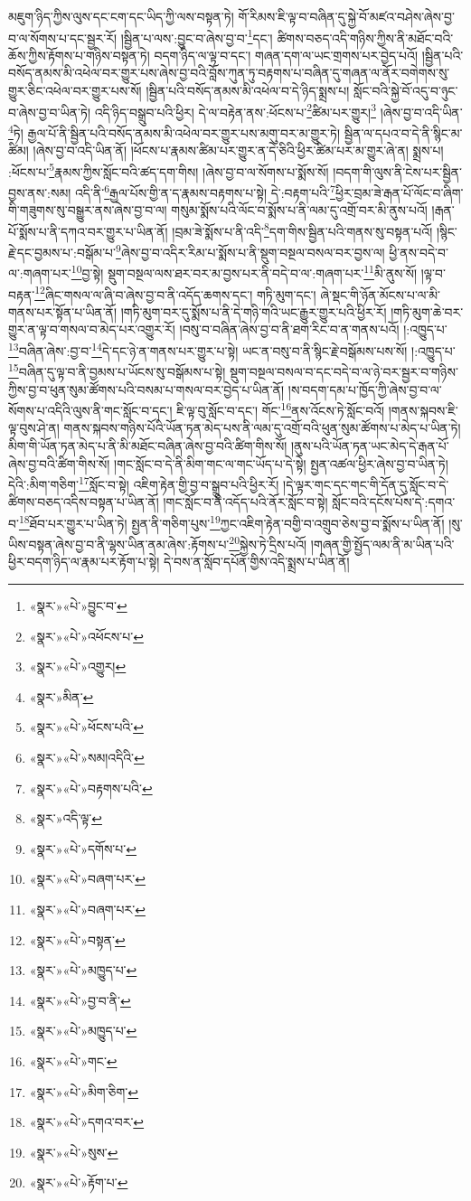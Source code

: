 མཇུག་ཉིད་ཀྱིས་ལུས་དང་ངག་དང་ཡིད་ཀྱི་ལས་བསྟན་ཏེ། གོ་རིམས་ཇི་ལྟ་བ་བཞིན་དུ་སྐྱེ་བོ་མཛའ་བཤེས་ཞེས་བྱ་བ་ལ་སོགས་པ་དང་སྦྱར་རོ། །སྦྱིན་པ་ལས་:བྱུང་བ་ཞེས་བྱ་བ་\footnote{«སྣར་»«པེ་»བྱུང་བ་}དང་། ཚིགས་བཅད་འདི་གཉིས་ཀྱིས་ནི་མཐོང་བའི་ཆོས་ཀྱིས་རྟོགས་པ་གཉིས་བསྟན་ཏེ། བདག་ཉིད་ལ་ལྟ་བ་དང་། གཞན་དག་ལ་ཡང་གྲགས་པར་བྱེད་པའོ། །སྦྱིན་པའི་བསོད་ནམས་མི་འཕེལ་བར་གྱུར་པས་ཞེས་བྱ་བའི་བློས་ཀུན་ཏུ་བརྟགས་པ་བཞིན་དུ་གཞན་ལ་ནོར་བགེགས་སུ་གྱུར་ཅིང་འཕེལ་བར་གྱུར་པས་སོ། །སྦྱིན་པའི་བསོད་ནམས་མི་འཕེལ་བ་དེ་ཉིད་སྨྲས་པ། སློང་བའི་སྐྱེ་བོ་འདུ་བ་ཉུང་བ་ཞེས་བྱ་བ་ཡིན་ཏེ། འདི་ཉིད་བསྒྲུབ་པའི་ཕྱིར། དེ་ལ་བརྟེན་ནས་:ཕོངས་པ་\footnote{«སྣར་»«པེ་»འཕོངས་པ་}ཚིམ་པར་གྱུར།\footnote{«སྣར་»«པེ་»འགྱུར།} །ཞེས་བྱ་བ་འདི་ཡིན་\footnote{«སྣར་»མིན་}ཏེ། རྒྱལ་པོ་ནི་སྦྱིན་པའི་བསོད་ནམས་མི་འཕེལ་བར་གྱུར་པས་མགུ་བར་མ་གྱུར་ཏེ། སྦྱིན་ལ་དཔའ་བ་དེ་ནི་སྙིང་མ་ཚིམ། །ཞེས་བྱ་བ་འདི་ཡིན་ནོ། །ཕོངས་པ་རྣམས་ཚིམ་པར་གྱུར་ན་དེ་ཅིའི་ཕྱིར་ཚིམ་པར་མ་གྱུར་ཞེ་ན། སྨྲས་པ། :ཕོངས་པ་\footnote{«སྣར་»«པེ་»ཕོངས་པའི་}རྣམས་ཀྱིས་སློང་བའི་ཚད་དག་གིས། །ཞེས་བྱ་བ་ལ་སོགས་པ་སྨོས་སོ། །བདག་གི་ལུས་ནི་ངེས་པར་སྦྱིན་བྱས་ནས་:སམ། འདི་ནི་\footnote{«སྣར་»«པེ་»སམ།འདིའི་}རྒྱལ་པོས་གྱི་ན་ད་རྣམས་བརྟགས་པ་སྟེ། དེ་:བརྟག་པའི་\footnote{«སྣར་»«པེ་»བརྟགས་པའི་}ཕྱིར་བྲམ་ཟེ་རྒན་པོ་ལོང་བ་ཞིག་གི་གཟུགས་སུ་བསྒྱུར་ནས་ཞེས་བྱ་བ་ལ། གསུམ་སྨོས་པའི་ལོང་བ་སྨོས་པ་ནི་ལམ་དུ་འགྲོ་བར་མི་ནུས་པའོ། །རྒན་པོ་སྨོས་པ་ནི་དཀའ་བར་གྱུར་པ་ཡིན་ནོ། །བྲམ་ཟེ་སྨོས་པ་ནི་འདི་\footnote{«སྣར་»འདི་ལྟ་}དག་གིས་སྦྱིན་པའི་གནས་སུ་བསྟན་པའོ། །སྙིང་རྗེ་དང་བྱམས་པ་:བསྒོམ་པ་\footnote{«སྣར་»«པེ་»དགོས་པ་}ཞེས་བྱ་བ་འདིར་རིམ་པ་སྨོས་པ་ནི་སྡུག་བསྔལ་བསལ་བར་བྱས་ལ། ཕྱི་ནས་བདེ་བ་ལ་:གཞག་པར་\footnote{«སྣར་»«པེ་»བཞག་པར་}བྱ་སྟེ། སྡུག་བསྔལ་ལས་ཐར་བར་མ་བྱས་པར་ནི་བདེ་བ་ལ་:གཞག་པར་\footnote{«སྣར་»«པེ་»བཞག་པར་}མི་ནུས་སོ། །ལྟ་བ་བརྟན་\footnote{«སྣར་»«པེ་»བསྟན་}ཞིང་གསལ་ལ་ཞི་བ་ཞེས་བྱ་བ་ནི་འདོད་ཆགས་དང་། གཏི་མུག་དང་། ཞེ་སྡང་གི་ཉོན་མོངས་པ་ལ་མི་གནས་པར་སྟོན་པ་ཡིན་ནོ། །གཏི་མུག་བར་དུ་སྨོས་པ་ནི་དེ་གཉི་གའི་ཡང་རྒྱུར་གྱུར་པའི་ཕྱིར་རོ། །གཏི་མུག་ཆེ་བར་གྱུར་ན་ལྟ་བ་གསལ་བ་མེད་པར་འགྱུར་རོ། །བསུ་བ་བཞིན་ཞེས་བྱ་བ་ནི་ཐག་རིང་བ་ན་གནས་པའོ། །:འཁྱུད་པ་\footnote{«སྣར་»«པེ་»མཁྱུད་པ་}བཞིན་ཞེས་:བྱ་བ་\footnote{«སྣར་»«པེ་»བྱ་བ་ནི་}དེ་དང་ཉེ་ན་གནས་པར་གྱུར་པ་སྟེ། ཡང་ན་བསུ་བ་ནི་སྙིང་རྗེ་བསྒོམས་པས་སོ། །:འཁྱུད་པ་\footnote{«སྣར་»«པེ་»མཁྱུད་པ་}བཞིན་དུ་ལྟ་བ་ནི་བྱམས་པ་ཡོངས་སུ་བསྒོམས་པ་སྟེ། སྡུག་བསྔལ་བསལ་བ་དང་བདེ་བ་ལ་ཉེ་བར་སྦྱར་བ་གཉིས་ཀྱིས་བྱ་བ་ཕུན་སུམ་ཚོགས་པའི་བསམ་པ་གསལ་བར་བྱེད་པ་ཡིན་ནོ། །ས་བདག་དམ་པ་ཁྱོད་ཀྱི་ཞེས་བྱ་བ་ལ་སོགས་པ་འདིའི་ལུས་ནི་གང་སློང་བ་དང་། ཇི་ལྟ་བུ་སློང་བ་དང་། གོང་\footnote{«སྣར་»«པེ་»གང་}ནས་འོངས་ཏེ་སློང་བའོ། །གནས་སྐབས་ཇི་ལྟ་བུས་ཤེ་ན། གནས་སྐབས་གཉིས་པོའི་ཡོན་ཏན་མེད་པས་ནི་ལམ་དུ་འགྲོ་བའི་ཕུན་སུམ་ཚོགས་པ་མེད་པ་ཡིན་ཏེ། མིག་གི་ཡོན་ཏན་མེད་པ་ནི་མི་མཐོང་བཞིན་ཞེས་བྱ་བའི་ཚིག་གིས་སོ། །ནུས་པའི་ཡོན་ཏན་ཡང་མེད་དེ་རྒན་པོ་ཞེས་བྱ་བའི་ཚིག་གིས་སོ། །གང་སློང་བ་དེ་ནི་མིག་གང་ལ་གང་ཡོད་པ་དེ་སྟེ། སྤྱན་འཚལ་ཕྱིར་ཞེས་བྱ་བ་ཡིན་ཏེ། དེའི་:མིག་གཅིག་\footnote{«སྣར་»«པེ་»མིག་ཅིག་}སློང་བ་སྟེ། འཇིག་རྟེན་གྱི་བྱ་བ་སྒྲུབ་པའི་ཕྱིར་རོ། །དེ་ལྟར་གང་དང་གང་གི་དོན་དུ་སློང་བ་དེ་ཚིགས་བཅད་འདིས་བསྟན་པ་ཡིན་ནོ། །གང་སློང་བ་ནི་འདོད་པའི་ནོར་སློང་བ་སྟེ། སློང་བའི་དངོས་པོས་དེ་:དགའ་བ་\footnote{«སྣར་»«པེ་»དགའ་བར་}ཐོབ་པར་གྱུར་པ་ཡིན་ཏེ། སྤྱན་ནི་གཅིག་པུས་\footnote{«སྣར་»«པེ་»སུས་}ཀྱང་འཇིག་རྟེན་བགྱི་བ་འགྲུབ་ཅེས་བྱ་བ་སྨོས་པ་ཡིན་ནོ། །སུ་ཡིས་བསྟན་ཞེས་བྱ་བ་ནི་ལྷས་ཡིན་ནམ་ཞེས་:རྟོགས་པ་\footnote{«སྣར་»«པེ་»རྟོག་པ་}སྐྱེས་ཏེ་དྲིས་པའོ། །གཞན་གྱི་སྤྱོད་ལམ་ནི་མ་ཡིན་པའི་ཕྱིར་བདག་ཉིད་ལ་རྣམ་པར་རྟོག་པ་སྟེ། དེ་བས་ན་སློབ་དཔོན་གྱིས་འདི་སྨྲས་པ་ཡིན་ནོ། 